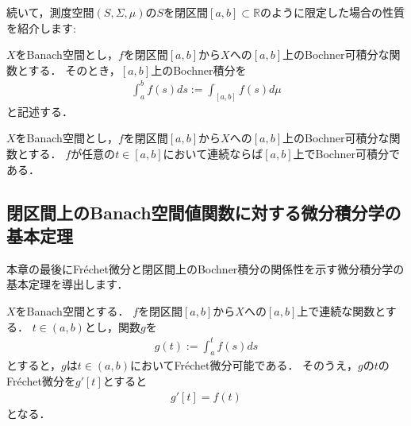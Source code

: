 続いて，測度空間$(S, \Sigma, \mu)$の$S$を閉区間$[a, b] \subset {\mathbb R}$のように限定した場合の性質を紹介します:

\begin{defi}[閉区間上のBochner積分]\label{def:bochner_integral_for_interval}
$X$をBanach空間とし，$f$を閉区間$[a, b]$から$X$への$[a,b]$上のBochner可積分な関数とする．
そのとき，$[a,b]$上のBochner積分を
	\begin{align*}
		\int_a^b f(s) d s := \int_{[a,b]} f(s) d \mu
	\end{align*}
と記述する．
\end{defi}

\begin{Thm}[閉区間上の連続作用素とBochner積分]\label{thm:Bochnerable}
	$X$をBanach空間とし，$f$を閉区間$[a, b]$から$X$への$[a,b]$上のBochner可積分な関数とする．
	$f$が任意の$t \in [a, b]$において連続ならば$[a, b]$上でBochner可積分である．
\end{Thm}

\subsection{閉区間上のBanach空間値関数に対する微分積分学の基本定理}\label{sec:Fund_theorem}
本章の最後にFr\'echet微分と閉区間上のBochner積分の関係性を示す微分積分学の基本定理を導出します．


\begin{Thm}[Fr\'echet微分と閉区間上におけるBochner積分に対する微分積分学の基本定理(i)]\label{the:fund_theorem_i}
$X$をBanach空間とする．
$f$を閉区間$[a, b]$から$X$への$[a,b]$上で連続な関数とする．
$t \in (a, b )$とし，関数$g$を
\begin{align*}
	g( t ) := \int_a^t f(s) ds
\end{align*}
とすると，$g$は$t \in (a, b )$においてFr\'echet微分可能である．
そのうえ，$g$の$t$のFr\'echet微分を$g'[t]$とすると
\begin{align*}
	g'[t] = f(t)
\end{align*}
となる．
\end{Thm}

